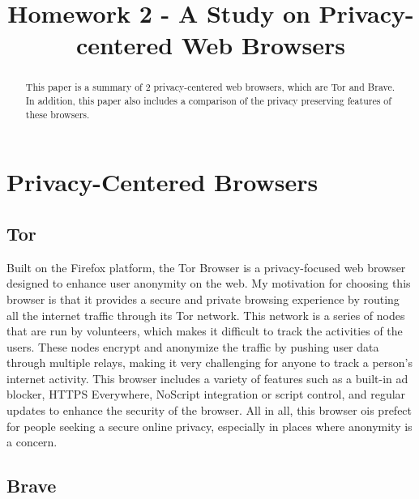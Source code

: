\documentclass[conference]{IEEEtran}
\begin{document}
\title{Homework 2 - A Study on Privacy-centered Web Browsers\\
}

\author{
}

\maketitle

\begin{abstract}
This paper is a summary of 2 privacy-centered web browsers, which are Tor and
Brave. In addition, this paper also includes a comparison of the privacy
preserving features of these browsers.
\end{abstract}

\section{Privacy-Centered Browsers}

\subsection{Tor}

Built on the Firefox platform, the Tor Browser is a privacy-focused web browser
designed to enhance user anonymity on the web. My motivation for choosing this
browser is that it provides a secure and private browsing experience by routing
all the internet traffic through its Tor network. This network is a series of
nodes that are run by volunteers, which makes it difficult to track the
activities of the users. These nodes encrypt and anonymize the traffic by
pushing user data through multiple relays, making it very challenging for anyone
to track a person's internet activity. This browser includes a variety of
features such as a built-in ad blocker, HTTPS Everywhere, NoScript
integration or script control, and regular updates to enhance the security of
the browser\cite{b1}. All in all, this browser ois prefect for people seeking a secure
online privacy, especially in places where anonymity is a concern.

\subsection{Brave}
\end{document}
